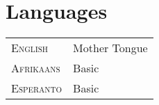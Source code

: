 
\section{Languages}

\begin{tabular}{R{2.5cm}|l}
\textsc{English} & Mother Tongue\\
\textsc{Afrikaans} & Basic\\
\textsc{Esperanto} & Basic\\
\end{tabular}
